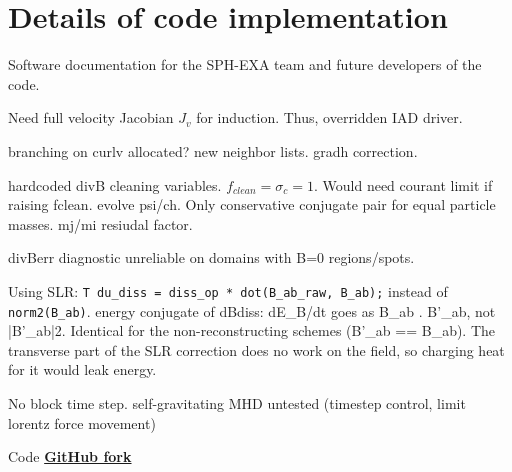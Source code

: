 
\section{Details of code implementation}
Software documentation for the SPH-EXA team and future developers of the code. 

Need full velocity Jacobian $J_v$ for induction. Thus, overridden IAD driver. 

branching on curlv allocated? new neighbor lists. gradh correction.

hardcoded divB cleaning variables. $f_{clean}=\sigma_c = 1$. Would need courant limit if raising fclean. evolve psi/ch. Only conservative conjugate pair for equal particle masses. mj/mi resiudal factor. 

divBerr diagnostic unreliable on domains with B=0 regions/spots. 

Using SLR: \texttt{T du\_diss = diss\_op * dot(B\_ab\_raw, B\_ab);} instead of \texttt{norm2(B\_ab)}.
energy conjugate of dBdiss: dE\_B/dt goes as B\_ab . B'\_ab, not |B'\_ab|2. Identical for the non-reconstructing schemes (B'\_ab == B\_ab). The transverse part of the SLR correction does no work on the field, so charging heat for it would leak energy.

No block time step. self-gravitating MHD untested (timestep control, limit lorentz force movement)

Code \href{https://github.com/MuellerNico/sphexa/commits/develop/}{\textbf{GitHub fork}}

